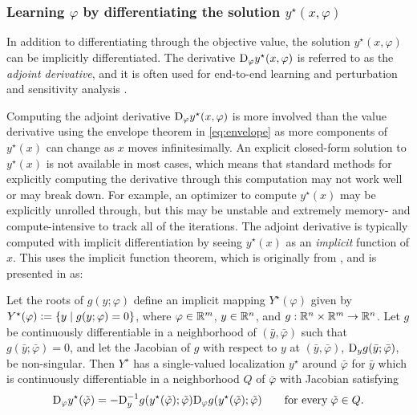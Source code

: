 \subsubsection{Learning $\varphi$ by differentiating the solution $y^\star(x, \varphi)$}
In addition to differentiating through the objective value, the solution
$y^\star(x, \varphi)$ can be implicitly differentiated.
The derivative $\mathrm{D}_\varphi y^\star(x, \varphi)$ is referred to
as the \emph{adjoint derivative}, and it is often used for
end-to-end learning
\citep{domke2012generic,gould2016differentiating,amos2017optnet,barratt2018differentiability,amos2019differentiable,agrawal2019differentiable,bai2019deep,bai2020multiscale}
and perturbation and sensitivity analysis
\citep{bank1982non,fiacco1990sensitivity,shapiro2003sensitivity,klatte2006nonsmooth,bonnans2013perturbation,still2018lectures,fiacco2020mathematical}.

Computing the adjoint derivative $\mathrm{D}_\varphi y^\star(x, \varphi)$ is more involved
than the value derivative using the envelope theorem
in \cref{eq:envelope} as more components of $y^\star(x)$
can change as $x$ moves infinitesimally.
An explicit closed-form solution to $y^\star(x)$ is
not available in most cases, which means that standard
methods for explicitly computing the derivative through
this computation may not work well or may break down.
For example, an optimizer to compute $y^\star(x)$ may be
explicitly unrolled through, but this may be
unstable and extremely memory- and compute-intensive
to track all of the iterations.
The adjoint derivative is typically computed with implicit
differentiation by seeing $y^\star(x)$ as an \emph{implicit}
function of $x$.
This uses the implicit function theorem,
which is originally from \citet{dini1878analisi},
and is presented in \citet[Theorem 1B.1]{dontchev2009implicit} as:
\begin{theorem}
  \label{thm:dini}
  Let the roots of $g(y; \varphi)$ define an implicit
  mapping $Y^\star(\varphi)$ given by $Y^\star(\varphi)\vcentcolon=\{y \mid g(y;\varphi)=0\}$,
  where $\varphi\in\mathbb{R}^m$, $y\in\mathbb{R}^n$, and
  $g: \mathbb{R}^n\times\mathbb{R}^m\rightarrow\mathbb{R}^n$.
  Let $g$ be continuously differentiable in a neighborhood of $(\bar y, \bar \varphi)$
  such that $g(\bar y; \bar \varphi)=0$, and let the Jacobian of $g$
  with respect to $y$ at $(\bar y, \bar \varphi)$,
  \ie $\mathrm{D}_y g(\bar y; \bar \varphi)$, be non-singular.
  Then $Y^\star$ has a single-valued localization $y^\star$
  around $\bar \varphi$ for $\bar y$ which is continuously differentiable
  in a neighborhood $Q$ of $\bar \varphi$ with Jacobian satisfying
  \begin{equation}
    \mathrm{D}_\varphi y^\star(\tilde \varphi) = -\mathrm{D}_y^{-1} g(y^\star(\tilde \varphi); \tilde \varphi) \mathrm{D}_\varphi g(y^\star(\tilde \varphi); \tilde \varphi)
    \qquad \mathrm{for\ every}\; \tilde \varphi\in Q.
    \label{eq:implicit-derivative}
  \end{equation}
\end{theorem}

